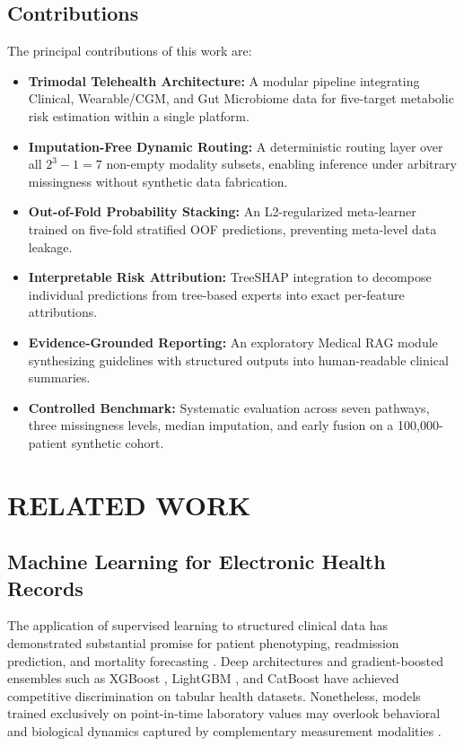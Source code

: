 \documentclass[10pt,twocolumn,letterpaper]{article}
\begin{document}
\subsection{Contributions}
The principal contributions of this work are:
\begin{itemize}
    \item \textbf{Trimodal Telehealth Architecture:} A modular pipeline integrating Clinical, Wearable/CGM, and Gut Microbiome data for five-target metabolic risk estimation within a single platform.
    \item \textbf{Imputation-Free Dynamic Routing:} A deterministic routing layer over all $2^{3}-1=7$ non-empty modality subsets, enabling inference under arbitrary missingness without synthetic data fabrication.
    \item \textbf{Out-of-Fold Probability Stacking:} An L2-regularized meta-learner trained on five-fold stratified OOF predictions, preventing meta-level data leakage.
    \item \textbf{Interpretable Risk Attribution:} TreeSHAP integration to decompose individual predictions from tree-based experts into exact per-feature attributions.
    \item \textbf{Evidence-Grounded Reporting:} An exploratory Medical RAG module synthesizing guidelines with structured outputs into human-readable clinical summaries.
    \item \textbf{Controlled Benchmark:} Systematic evaluation across seven pathways, three missingness levels, median imputation, and early fusion on a 100{,}000-patient synthetic cohort.
\end{itemize}

\section{RELATED WORK}

\subsection{Machine Learning for Electronic Health Records}
The application of supervised learning to structured clinical data has demonstrated substantial promise for patient phenotyping, readmission prediction, and mortality forecasting \citep{rajkomar2018scalable}. Deep architectures and gradient-boosted ensembles such as XGBoost \citep{chen2016xgboost}, LightGBM \citep{ke2017lightgbm}, and CatBoost \citep{prokhorenkova2018catboost} have achieved competitive discrimination on tabular health datasets. Nonetheless, models trained exclusively on point-in-time laboratory values may overlook behavioral and biological dynamics captured by complementary measurement modalities \citep{topol2019high}.
\end{document}
